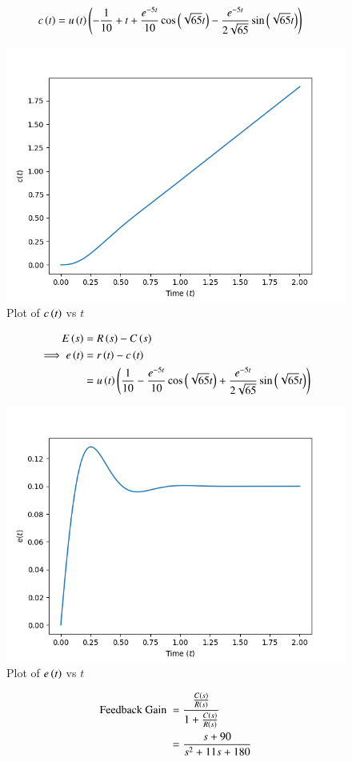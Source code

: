 \documentclass[journal,12pt,twocolumn]{IEEEtran}
\theoremstyle{remark}
\begin{document}
\begin{align}
c\left(t\right) &= u\left(t\right)\left(-\frac{1}{10} + t + \frac{e^{-5t}}{10} \cos{\ensuremath{\left(\sqrt{65}t\right)}} - \frac{e^{-5t}}{2\sqrt{65}}\sin{\ensuremath{\left(\sqrt{65}t\right)}}\right)
\end{align}
\begin{figure}[h!]
\centering
\includegraphics[width=\columnwidth]{figs/c_t.png}
\caption{Plot of $c\left(t\right)$ vs $t$}
\label{fig:2021bm46-3}
\end{figure}
\begin{align}
E\left(s\right) &= R\left(s\right) - C\left(s\right) \\
\implies e\left(t\right) &= r\left(t\right) - c\left(t\right) \\
&= u\left(t\right)\left(\frac{1}{10} - \frac{e^{-5t}}{10} \cos{\ensuremath{\left(\sqrt{65}t\right)}} + \frac{e^{-5t}}{2\sqrt{65}}\sin{\ensuremath{\left(\sqrt{65}t\right)}}\right)
\end{align}
\begin{figure}[h!]
\centering
\includegraphics[width=\columnwidth]{figs/e_t.png}
\caption{Plot of $e\left(t\right)$ vs $t$}
\label{fig:2021bm46-4}
\end{figure}
\begin{align}
\text{Feedback Gain } &= \frac{\frac{C\left(s\right)}{R\left(s\right)}}{1 + \frac{C\left(s\right)}{R\left(s\right)}} \\
&= \frac{s + 90}{s^2 + 11s + 180}
\end{align}
\end{document}
